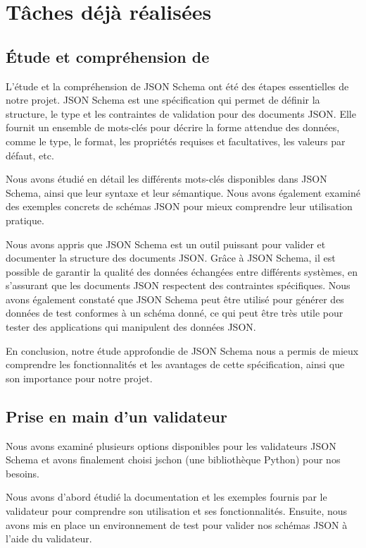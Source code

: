 \documentclass{article}
\begin{document}
\section{Tâches déjà réalisées}
    \subsection{Étude et compréhension de {\jsonsch}}
    L'étude et la compréhension de JSON Schema ont été des étapes essentielles de notre projet. JSON Schema est une spécification qui permet de définir la structure, le type et les contraintes de validation pour des documents JSON. Elle fournit un ensemble de mots-clés pour décrire la forme attendue des données, comme le type, le format, les propriétés requises et facultatives, les valeurs par défaut, etc.

    Nous avons étudié en détail les différents mots-clés disponibles dans JSON Schema, ainsi que leur syntaxe et leur sémantique. Nous avons également examiné des exemples concrets de schémas JSON pour mieux comprendre leur utilisation pratique.

    Nous avons appris que JSON Schema est un outil puissant pour valider et documenter la structure des documents JSON. Grâce à JSON Schema, il est possible de garantir la qualité des données échangées entre différents systèmes, en s'assurant que les documents JSON respectent des contraintes spécifiques. Nous avons également constaté que JSON Schema peut être utilisé pour générer des données de test conformes à un schéma donné, ce qui peut être très utile pour tester des applications qui manipulent des données JSON.

    En conclusion, notre étude approfondie de JSON Schema nous a permis de mieux comprendre les fonctionnalités et les avantages de cette spécification, ainsi que son importance pour notre projet.
    \subsection{Prise en main d'un validateur {\jsonsch}}
     Nous avons examiné plusieurs options disponibles pour les validateurs JSON Schema et avons finalement choisi jschon (une bibliothèque Python) pour nos besoins.

    Nous avons d'abord étudié la documentation et les exemples fournis par le validateur pour comprendre son utilisation et ses fonctionnalités. Ensuite, nous avons mis en place un environnement de test pour valider nos schémas JSON à l'aide du validateur.
\end{document}
